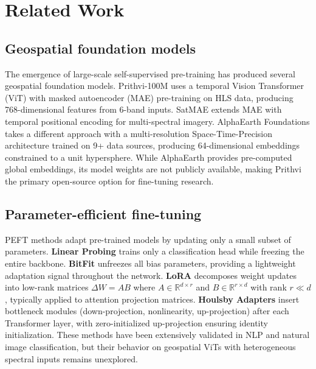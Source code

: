 \documentclass{article}
\begin{document}
\section{Related Work}
\label{sec:related}

\subsection{Geospatial foundation models}

The emergence of large-scale self-supervised pre-training has produced several geospatial foundation models. Prithvi-100M \citep{jakubik2024prithvi} uses a temporal Vision Transformer (ViT) with masked autoencoder (MAE) pre-training on HLS data, producing 768-dimensional features from 6-band inputs. SatMAE \citep{cong2022satmae} extends MAE with temporal positional encoding for multi-spectral imagery. AlphaEarth Foundations \citep{brown2025alphaearth} takes a different approach with a multi-resolution Space-Time-Precision architecture trained on 9+ data sources, producing 64-dimensional embeddings constrained to a unit hypersphere. While AlphaEarth provides pre-computed global embeddings, its model weights are not publicly available, making Prithvi the primary open-source option for fine-tuning research.

\subsection{Parameter-efficient fine-tuning}

PEFT methods adapt pre-trained models by updating only a small subset of parameters. \textbf{Linear Probing} trains only a classification head while freezing the entire backbone. \textbf{BitFit} \citep{zaken2022bitfit} unfreezes all bias parameters, providing a lightweight adaptation signal throughout the network. \textbf{LoRA} \citep{hu2022lora} decomposes weight updates into low-rank matrices $\Delta W = AB$ where $A \in \mathbb{R}^{d \times r}$ and $B \in \mathbb{R}^{r \times d}$ with rank $r \ll d$, typically applied to attention projection matrices. \textbf{Houlsby Adapters} \citep{houlsby2019adapter} insert bottleneck modules (down-projection, nonlinearity, up-projection) after each Transformer layer, with zero-initialized up-projection ensuring identity initialization. These methods have been extensively validated in NLP and natural image classification, but their behavior on geospatial ViTs with heterogeneous spectral inputs remains unexplored.
\end{document}
